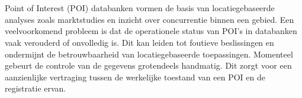 
%
%
%
%
%

%



\chapter*{}
Point of Interest (POI) databanken vormen de basis van locatiegebaseerde analyses zoals marktstudies en inzicht over concurrentie binnen een gebied. Een veelvoorkomend probleem is dat de operationele status van POI's in databanken vaak verouderd of onvolledig is. Dit kan leiden tot foutieve beslissingen en ondermijnt de betrouwbaarheid van locatiegebaseerde toepassingen. Momenteel gebeurt de controle van de gegevens grotendeels handmatig. Dit zorgt voor een aanzienlijke vertraging tussen de werkelijke toestand van een POI en de registratie ervan.

